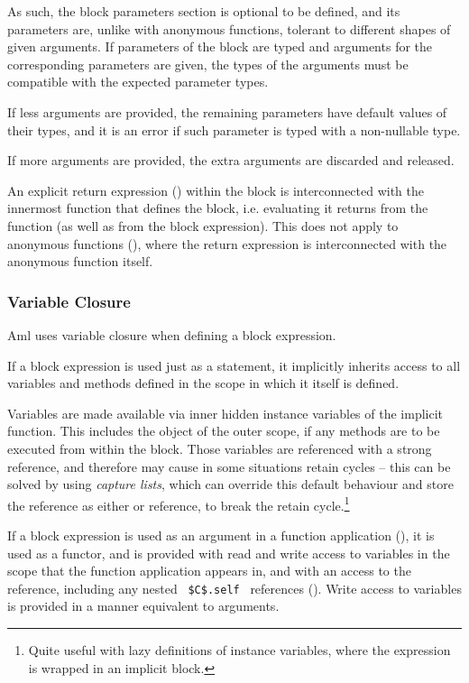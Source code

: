 As such, the block parameters section is optional to be defined, and its parameters are, unlike with anonymous functions, tolerant to different shapes of given arguments. If parameters of the block are typed and arguments for the corresponding parameters are given, the types of the arguments must be compatible with the expected parameter types. 

If less arguments are provided, the remaining parameters have default values of their types, and it is an error if such parameter is typed with a non-nullable type. 

If more arguments are provided, the extra arguments are discarded and released. 

An explicit return expression () within the block is interconnected with the innermost function that defines the block, i.e. evaluating it returns from the function (as well as from the block expression). This does not apply to anonymous functions (), where the return expression is interconnected with the anonymous function itself. 






\subsubsection{Variable Closure}
\label{sec:variable-closure}

Aml uses variable closure when defining a block expression. 

If a block expression is used just as a statement, it implicitly inherits access to all variables and methods defined in the scope in which it itself is defined. 

Variables are made available via inner hidden instance variables of the implicit function. This includes the  object of the outer scope, if any methods are to be executed from within the block. Those variables are referenced with a strong reference, and therefore may cause in some situations retain cycles -- this can be solved by using {\em capture lists}, which can override this default behaviour and store the reference as either  or  reference, to break the retain cycle.\footnote{Quite useful with lazy definitions of instance variables, where the expression is wrapped in an implicit block.} 

If a block expression is used as an argument in a function application (), it is used as a functor, and is provided with read and write access to variables in the scope that the function application appears in, and with an access to the  reference, including any nested ~\lstinline!$C$.self!~ references (). Write access to variables is provided in a manner equivalent to  arguments. 

